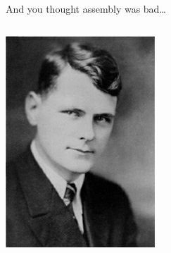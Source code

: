 \documentclass[9pt,aspectratio=169]{beamer}
\begin{document}
\begin{frame}[label={sec:org456b4b3},fragile]{And you thought assembly was bad\ldots{}}
\begin{columns}
\begin{column}[t]{0.2\columnwidth}
\begin{center}
\includegraphics[width=\linewidth]{./church.jpg}
\end{center}
\end{column}
\end{columns}
\end{frame}
\end{document}

